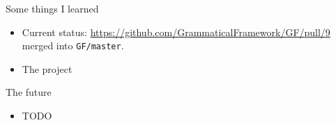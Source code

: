 \documentclass{beamer}
\begin{document}
  \begin{frame}{Some things I learned}
    \begin{itemize}
      \item<1-> Current status:
        \href{first PR}{https://github.com/GrammaticalFramework/GF/pull/9}
        merged into \texttt{GF/master}.
      \item<2-> The project
    \end{itemize}
  \end{frame}

  \begin{frame}{The future}
    \begin{itemize}
      \item TODO
    \end{itemize}
  \end{frame}
\end{document}
